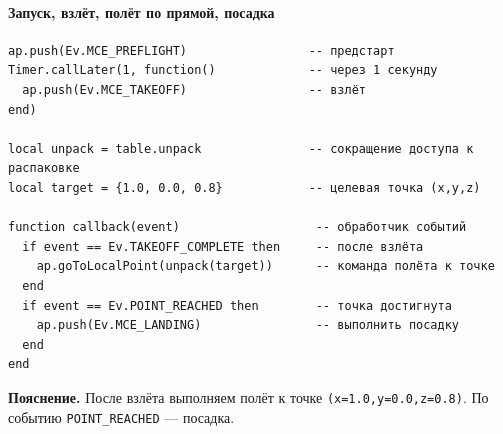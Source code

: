 \paragraph{Запуск, взлёт, полёт по прямой, посадка}
\begin{verbatim}
ap.push(Ev.MCE_PREFLIGHT)                 -- предстарт
Timer.callLater(1, function()             -- через 1 секунду
  ap.push(Ev.MCE_TAKEOFF)                 -- взлёт
end)

local unpack = table.unpack               -- сокращение доступа к распаковке
local target = {1.0, 0.0, 0.8}            -- целевая точка (x,y,z)

function callback(event)                   -- обработчик событий
  if event == Ev.TAKEOFF_COMPLETE then     -- после взлёта
    ap.goToLocalPoint(unpack(target))      -- команда полёта к точке
  end
  if event == Ev.POINT_REACHED then        -- точка достигнута
    ap.push(Ev.MCE_LANDING)                -- выполнить посадку
  end
end
\end{verbatim}
\textbf{Пояснение.} После взлёта выполняем полёт к точке \texttt{(x=1.0,y=0.0,z=0.8)}. По событию \texttt{POINT\_REACHED} — посадка.
